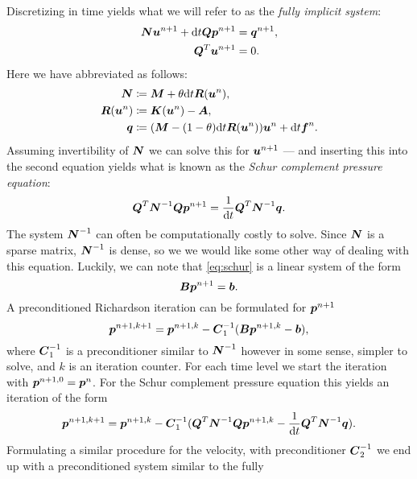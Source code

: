 Discretizing in time yields what we will refer to as the \emph{fully implicit
system}:
\begin{align}
    \boldsymbol{N}\boldsymbol{u}^{n+1} + \mathrm{d} t \boldsymbol{Q}\boldsymbol{p}^{n+1} &= \boldsymbol{q}^{n+1}, \\
    \boldsymbol{Q}^T\boldsymbol{u}^{n+1} &= 0.
\end{align}
Here we have abbreviated as follows:
\begin{align}
    \boldsymbol{N} &\coloneqq \boldsymbol{M} + \theta \mathrm{d} t \boldsymbol{R}(\boldsymbol{u}^{n}), \\
    \boldsymbol{R}(\boldsymbol{u}^n) &\coloneqq \boldsymbol{K}(\boldsymbol{u}^n) - \boldsymbol{A}, \\
    \boldsymbol{q} &\coloneqq (\boldsymbol{M} - (1- \theta)\mathrm{d} t \boldsymbol{R}(\boldsymbol{u}^n))\boldsymbol{u}^n + \mathrm{d} t \boldsymbol{f}^{n}.
\end{align}
Assuming invertibility of \( \boldsymbol{N} \) we can solve this for \( \boldsymbol{u}^{n+1} \)
--- and inserting this into the second equation yields what is known as the
\emph{Schur complement pressure equation}:
\begin{align}
    \label{eq:schur}
    \boldsymbol{Q}^T\boldsymbol{N}^{-1}\boldsymbol{Q}\boldsymbol{p}^{n+1} = \frac{1}{\mathrm{d} t}\boldsymbol{Q}^T\boldsymbol{N}^{-1}\boldsymbol{q}.
\end{align}
The system \( \boldsymbol{N}^{-1} \) can often be computationally costly to solve.
Since \( \boldsymbol{N} \) is a sparse matrix, \(\boldsymbol{N}^{-1}\) is dense, so we we
would like some other way of dealing with this equation.  Luckily, we can note
that \cref{eq:schur} is a linear system of the form
\begin{equation}
    \boldsymbol{B} \boldsymbol{p}^{n+1} = \boldsymbol{b}.
\end{equation}
A preconditioned Richardson iteration can be formulated for \( \boldsymbol{p}^{n+1} \)
\begin{equation}
    \boldsymbol{p}^{n+1, k+1} = \boldsymbol{p}^{n+1, k} - \boldsymbol{C}_1^{-1}(\boldsymbol{B}\boldsymbol{p}^{n+1, k} - \boldsymbol{b}),
\end{equation}
where \(\boldsymbol{C}_1^{-1}\) is a preconditioner similar to \(\boldsymbol{N}^{-1}\)
however in some sense, simpler to solve, and \( k \) is an iteration counter.
For each time level we start the iteration with \( \boldsymbol{p}^{n+1, 0} = \boldsymbol{p}^n
\). For the Schur complement pressure equation this yields an iteration of the
form
\begin{equation}
    \boldsymbol{p}^{n+1, k+1} = \boldsymbol{p}^{n+1, k} - \boldsymbol{C}_1^{-1}(\boldsymbol{Q}^T\boldsymbol{N}^{-1}\boldsymbol{Q}\boldsymbol{p}^{n+1, k} - \frac{1}{\mathrm{d} t}\boldsymbol{Q}^T \boldsymbol{N}^{-1} \boldsymbol{q}).
\end{equation}
Formulating a similar procedure for the velocity, with preconditioner
\(\boldsymbol{C}_2^{-1}\) we end up with a preconditioned system similar to the fully
